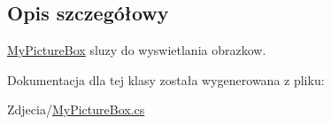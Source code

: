 \subsection{Opis szczegółowy}
\hyperlink{class_zdjecia_1_1_my_picture_box}{My\+Picture\+Box} sluzy do wyswietlania obrazkow. 

Dokumentacja dla tej klasy została wygenerowana z pliku\+:\begin{DoxyCompactItemize}
\item 
Zdjecia/\hyperlink{_my_picture_box_8cs}{My\+Picture\+Box.\+cs}\end{DoxyCompactItemize}
